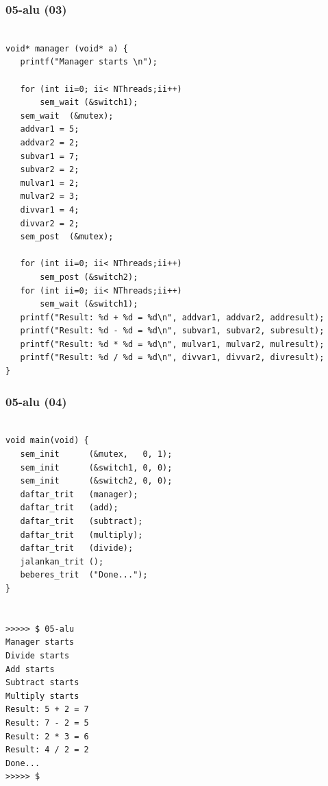 \documentclass[xcolor=table, notheorems, hyperref={pdfpagelabels=false}]{beamer}
\begin{document}
\begin{frame}[fragile]
\frametitle{05-alu (03)}
\begin{lstlisting}[basicstyle=\ttfamily\tiny]

void* manager (void* a) {
   printf("Manager starts \n");

   for (int ii=0; ii< NThreads;ii++)
       sem_wait (&switch1);
   sem_wait  (&mutex);
   addvar1 = 5;
   addvar2 = 2;
   subvar1 = 7;
   subvar2 = 2;
   mulvar1 = 2;
   mulvar2 = 3;
   divvar1 = 4;
   divvar2 = 2;
   sem_post  (&mutex);

   for (int ii=0; ii< NThreads;ii++)
       sem_post (&switch2);
   for (int ii=0; ii< NThreads;ii++)
       sem_wait (&switch1);
   printf("Result: %d + %d = %d\n", addvar1, addvar2, addresult);
   printf("Result: %d - %d = %d\n", subvar1, subvar2, subresult);
   printf("Result: %d * %d = %d\n", mulvar1, mulvar2, mulresult);
   printf("Result: %d / %d = %d\n", divvar1, divvar2, divresult);
}

\end{lstlisting}
\end{frame}

\begin{frame}[fragile]
\frametitle{05-alu (04)}
\begin{lstlisting}[basicstyle=\ttfamily\tiny]

void main(void) {
   sem_init      (&mutex,   0, 1);
   sem_init      (&switch1, 0, 0);
   sem_init      (&switch2, 0, 0);
   daftar_trit   (manager);
   daftar_trit   (add);
   daftar_trit   (subtract);
   daftar_trit   (multiply);
   daftar_trit   (divide);
   jalankan_trit ();
   beberes_trit  ("Done...");
}


>>>>> $ 05-alu 
Manager starts 
Divide starts 
Add starts 
Subtract starts 
Multiply starts 
Result: 5 + 2 = 7
Result: 7 - 2 = 5
Result: 2 * 3 = 6
Result: 4 / 2 = 2
Done...
>>>>> $ 

\end{lstlisting}
\end{frame}
\end{document}
